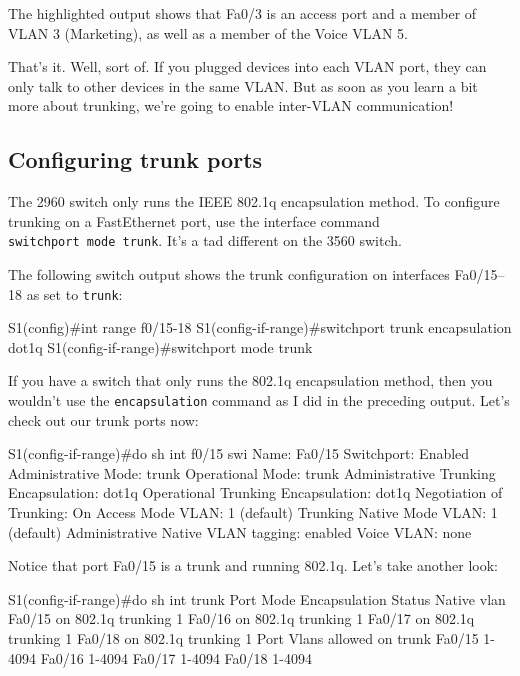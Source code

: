 The highlighted output shows that Fa0/3 is an access port and a member
of VLAN 3 (Marketing), as well as a member of the Voice VLAN 5.

That's it. Well, sort of. If you plugged devices into each VLAN port,
they can only talk to other devices in the same VLAN. But as soon as you
learn a bit more about trunking, we're going to enable inter-VLAN
communication!



\subsection{Configuring trunk ports}

The 2960 switch only runs the IEEE 802.1q encapsulation method. To
configure trunking on a FastEthernet port, use the interface command
\texttt{switchport\ mode\ trunk}. It's a tad diff­erent on the 3560
switch.

The following switch output shows the trunk configuration on interfaces
Fa0/15--18 as set to \texttt{trunk}:

\begin{cli}
S1(config)#int range f0/15-18
S1(config-if-range)#switchport trunk encapsulation dot1q
S1(config-if-range)#switchport mode trunk
\end{cli}

If you have a switch that only runs the 802.1q encapsulation method,
then you wouldn't use the \texttt{encapsulation} command as I did in the
preceding output. Let's check out our trunk ports now:

\begin{cli}
S1(config-if-range)#do sh int f0/15 swi
Name: Fa0/15
Switchport: Enabled
Administrative Mode: trunk
Operational Mode: trunk
Administrative Trunking Encapsulation: dot1q
Operational Trunking Encapsulation: dot1q
Negotiation of Trunking: On
Access Mode VLAN: 1 (default)
Trunking Native Mode VLAN: 1 (default)
Administrative Native VLAN tagging: enabled
Voice VLAN: none
\end{cli}

Notice that port Fa0/15 is a trunk and running 802.1q.
Let's take another look:

\begin{cli}
S1(config-if-range)#do sh int trunk
Port        Mode             Encapsulation  Status        Native vlan
Fa0/15      on               802.1q         trunking      1
Fa0/16      on               802.1q         trunking      1
Fa0/17      on               802.1q         trunking      1
Fa0/18      on               802.1q         trunking      1
Port        Vlans allowed on trunk
Fa0/15      1-4094
Fa0/16      1-4094
Fa0/17      1-4094
Fa0/18      1-4094
\end{cli}

